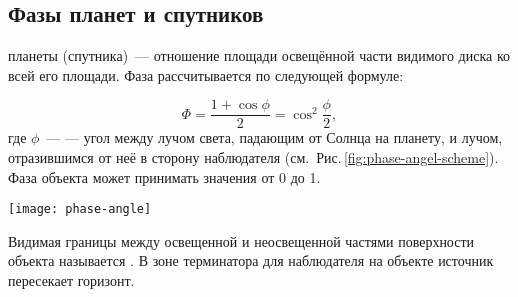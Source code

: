 \subsection{Фазы планет и спутников}

 планеты (спутника)~--- отношение площади освещённой  части видимого диска ко всей его площади.
Фаза рассчитывается по следующей формуле:

\begin{minipage}{0.65\tw}
	\begin{equation}
\Phi = \frac{1 + \cos \phi}{2} = \cos^2 \frac{\phi}{2},
\end{equation}
где $\phi$~---  --- угол между лучом света, падающим от Солнца на планету, и лучом, отразившимся от неё в сторону наблюдателя (см.~Рис.\,\ref{fig:phase-angel-scheme}). Фаза объекта может принимать значения от 0 до 1.
\end{minipage}
\begin{minipage}{0.35\tw}
	\hfill
	\texttt{[image: phase-angle]}
	\label{fig:phase-angel-scheme}
\end{minipage}

Видимая границы между освещенной и неосвещенной частями поверхности объекта называется . В зоне терминатора для наблюдателя на объекте источник пересекает горизонт.